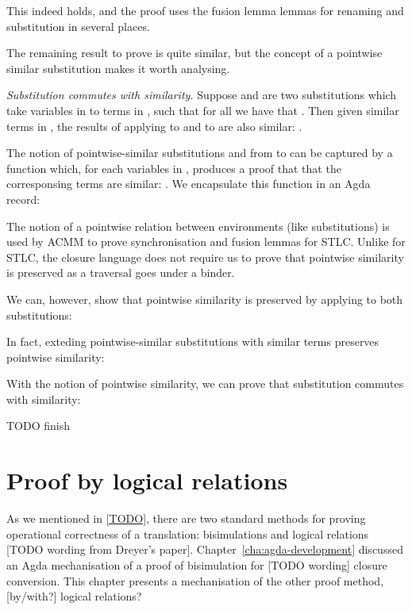 \documentclass[bsc,frontabs,oneside,singlespacing,parskip,deptreport]{infthesis}
\theoremstyle{definition}
\begin{document}
This indeed holds, and the proof uses the fusion lemma lemmas for
renaming and substitution in several places.

The remaining result to prove is quite similar, but the concept of a
pointwise similar substitution makes it worth analysing.

\textit{Substitution commutes with similarity.} Suppose  and 
are two 
substitutions which take variables  in  to terms in ,
such that for all  we have that . Then given similar terms  in , the results
of applying  to  and  to  are also
similar: .

The notion of pointwise-similar substitutions  and  from
 to 
can be captured by a function which, for each variables  in
, produces a proof that that the corresponsing terms are
similar: . We encapsulate this function
in an Agda record:


The notion of a pointwise relation between environments (like
substitutions) is used by ACMM to prove synchronisation and fusion
lemmas for STLC. Unlike for STLC, the closure language \lcl does not
require us to prove that pointwise similarity is preserved as a
traversal goes under a binder.

We can, however, show that pointwise similarity is preserved by
applying  to both substitutions:


In fact, exteding pointwise-similar substitutions with similar terms
preserves pointwise similarity:


With the notion of pointwise similarity, we can prove that
substitution commutes with similarity:


TODO finish

\chapter{Proof by logical relations}

As we mentioned in \ref{TODO}, there are two standard methods for
proving operational correctness of a translation: bisimulations and
logical relations [TODO wording from Dreyer's
paper]. Chapter~\ref{cha:agda-development} discussed an Agda
mechanisation of a proof of bisimulation for [TODO wording] closure
conversion. This chapter presents a mechanisation of the other proof
method, [by/with?] logical relations?
\end{document}
